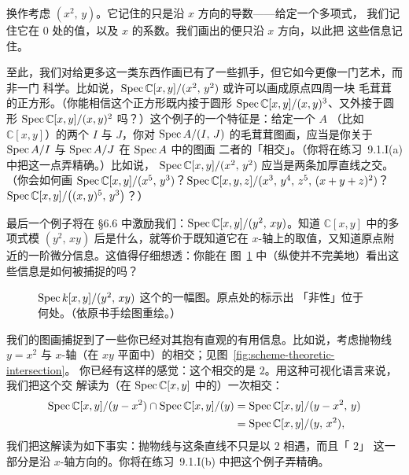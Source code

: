 换作考虑\trIdeal{} $(x^2,\,y)$。它记住的只是沿 $x$ 方向的导数——给定一个多项式，
我们记住它在 $0$ 处的值，以及 $x$ 的系数。我们画出的\trFuzz{}便只沿 $x$ 方向，以此把
这些信息记住。

至此，我们对给更多这一类东西作画已有了一些抓手，但它如今更像一门艺术，而非一门
科学。比如说，$\operatorname{Spec} \mathbb{C}[x,y]/(x^2,\,y^2)$ 或许可以画成原点四周一块
毛茸茸的正方形。（你能相信这个正方形既内接于圆形\trFuzz{}
$\operatorname{Spec} \mathbb{C}[x,y]/(x,y)^3$、又外接于圆形\trFuzz{}
$\operatorname{Spec} \mathbb{C}[x,y]/(x,y)^2$ 吗？）这个例子的一个特征是：给定一个\trRing{} $A$
（比如 $\mathbb{C}[x,y]$）的两个\trIdeal{} $I$ 与 $J$，你对 $\operatorname{Spec} A/(I,\,J)$
的毛茸茸图画，应当是你关于 $\operatorname{Spec} A/I$ 与 $\operatorname{Spec} A/J$ 在 $\operatorname{Spec} A$ 中的图画
二者的「相交」。（你将在练习~9.1.I(a) 中把这一点弄精确。）比如说，
$\operatorname{Spec} \mathbb{C}[x,y]/(x^2,\,y^2)$ 应当是两条加厚直线之交。（你会如何画
$\operatorname{Spec} \mathbb{C}[x,y]/(x^5,\,y^3)$？$\operatorname{Spec} \mathbb{C}[x,y,z]/(x^3,\,y^4,\,z^5,\,(x+y+z)^2)$？
$\operatorname{Spec} \mathbb{C}[x,y]/\bigl((x,y)^5,\,y^3\bigr)$？）

最后一个例子将在 \S6.6 中激励我们：$\operatorname{Spec} \mathbb{C}[x,y]/(y^2,\,xy)$。知道
$\mathbb{C}[x,y]$ 中的多项式模 $(y^2,\,xy)$ 后是什么，就等价于既知道它在
$x$-轴上的取值，又知道原点附近的一阶微分信息。这值得仔细想透：你能在
图~\ref{fig:nonreduced-y2xy} 中（纵使并不完美地）看出这些信息是如何被捕捉的吗？

\begin{figure}[htbp]
\centering
{}
\caption{$\operatorname{Spec} k[x,y]/(y^2,\,xy)$ 这个\trScheme{}的一幅图。原点处的\trFuzz{}标示出
「非\trReduced{}性」位于何处。（依原书手绘图重绘。）}%
\label{fig:nonreduced-y2xy}
\end{figure}

我们的图画捕捉到了一些你已经对其抱有直观的有用信息。比如说，考虑抛物线
$y=x^2$ 与 $x$-轴（在 $xy$ 平面中）的相交；见图~\ref{fig:scheme-theoretic-intersection}。
你已经有这样的感觉：这个相交的\trMultiplicity{}是 $2$。用这种可视化语言来说，我们把这个交
解读为（在 $\operatorname{Spec} \mathbb{C}[x,y]$ 中的）一次相交：
\begin{align*}
\operatorname{Spec} \mathbb{C}[x,y]/(y-x^2) \cap \operatorname{Spec} \mathbb{C}[x,y]/(y)
  &= \operatorname{Spec} \mathbb{C}[x,y]/(y-x^2,\,y)\\
  &= \operatorname{Spec} \mathbb{C}[x,y]/(y,\,x^2),
\end{align*}
我们把这解读为如下事实：抛物线与这条直线不只是以\trMultiplicity{} $2$ 相遇，而且「\trMultiplicity{} $2$」
这一部分是沿 $x$-轴方向的。你将在练习~9.1.I(b) 中把这个例子弄精确。

